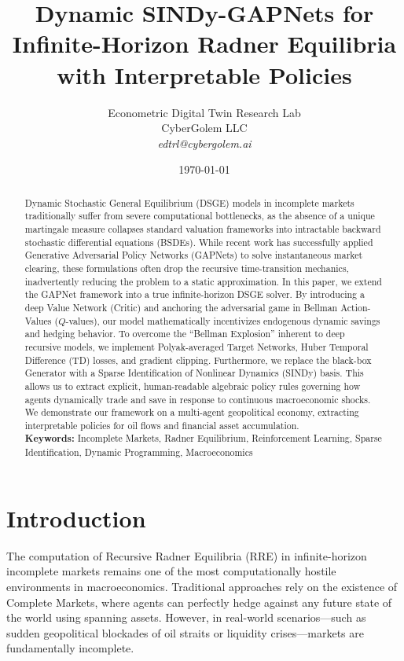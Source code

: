 \documentclass[11pt, a4paper]{article}
\title{\textbf{Dynamic SINDy-GAPNets for Infinite-Horizon Radner Equilibria with Interpretable Policies}}
\author{Econometric Digital Twin Research Lab\\
    CyberGolem LLC\\
    \textit{edtrl@cybergolem.ai}}
\date{\today}
\begin{document}
\maketitle

\begin{abstract}
\noindent Dynamic Stochastic General Equilibrium (DSGE) models in incomplete markets traditionally suffer from severe computational bottlenecks, as the absence of a unique martingale measure collapses standard valuation frameworks into intractable backward stochastic differential equations (BSDEs). While recent work has successfully applied Generative Adversarial Policy Networks (GAPNets) to solve instantaneous market clearing, these formulations often drop the recursive time-transition mechanics, inadvertently reducing the problem to a static approximation. In this paper, we extend the GAPNet framework into a true infinite-horizon DSGE solver. By introducing a deep Value Network (Critic) and anchoring the adversarial game in Bellman Action-Values ($Q$-values), our model mathematically incentivizes endogenous dynamic savings and hedging behavior. To overcome the ``Bellman Explosion'' inherent to deep recursive models, we implement Polyak-averaged Target Networks, Huber Temporal Difference (TD) losses, and gradient clipping. Furthermore, we replace the black-box Generator with a Sparse Identification of Nonlinear Dynamics (SINDy) basis. This allows us to extract explicit, human-readable algebraic policy rules governing how agents dynamically trade and save in response to continuous macroeconomic shocks. We demonstrate our framework on a multi-agent geopolitical economy, extracting interpretable policies for oil flows and financial asset accumulation.
\vspace{0.5cm}\\
\noindent \textbf{Keywords:} Incomplete Markets, Radner Equilibrium, Reinforcement Learning, Sparse Identification, Dynamic Programming, Macroeconomics
\end{abstract}

\section{Introduction}

The computation of Recursive Radner Equilibria (RRE) in infinite-horizon incomplete markets remains one of the most computationally hostile environments in macroeconomics. Traditional approaches rely on the existence of Complete Markets, where agents can perfectly hedge against any future state of the world using spanning assets. However, in real-world scenarios—such as sudden geopolitical blockades of oil straits or liquidity crises—markets are fundamentally incomplete. 
\end{document}
